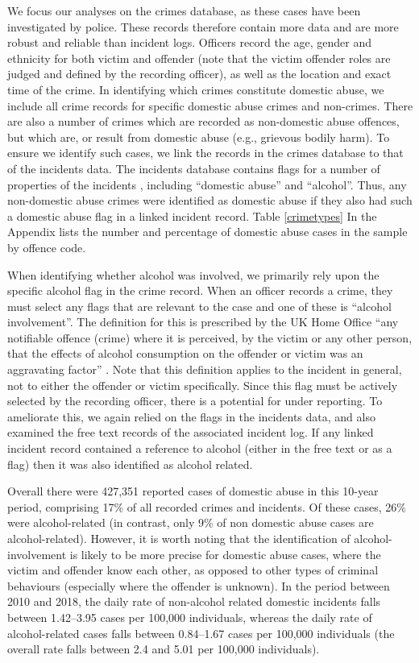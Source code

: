 \documentclass[12pt, a4paper]{article}
\begin{document}
We focus our analyses on the crimes database, as these cases have been investigated by police. These records therefore contain more data and are more robust and reliable than incident logs. Officers record the age, gender and ethnicity for both victim and offender (note that the victim offender roles are judged and defined by the recording officer), as well as the location and exact time of the crime. 
In identifying which crimes constitute domestic abuse, we include all crime records for specific domestic abuse crimes and non-crimes. There are also a number of crimes which are recorded as non-domestic abuse offences, but which are, or result from domestic abuse (e.g., grievous bodily harm). To ensure we identify such cases, we link the records in the crimes database to that of the incidents data. The incidents database contains flags for a number of properties of the incidents , including ``domestic abuse'' and ``alcohol''. Thus, any non-domestic abuse crimes were identified as domestic abuse if they also had such a domestic abuse flag in a linked incident record. Table \ref{crimetypes} In the Appendix lists the number and percentage of domestic abuse cases in the sample by offence code.

When identifying whether alcohol was involved, we primarily rely upon the specific alcohol flag in the crime record. When an officer records a crime, they must select any flags that are relevant to the case and one of these is ``alcohol involvement''. The definition for this is prescribed by the UK Home Office ``any notifiable offence (crime) where it is perceived, by the victim or any other person, that the effects of alcohol consumption on the offender or victim was an aggravating factor'' \cite{Office2019}. Note that this definition applies to the incident in general, not to either the offender or victim specifically. Since this flag must be actively selected by the recording officer, there is a potential for under reporting. To ameliorate this, we again relied on the flags in the incidents data, and also examined the free text records of the associated incident log. If any linked incident record contained a reference to alcohol (either in the free text or as a flag) then it was also identified as alcohol related.


 Overall there were 427,351 reported cases of domestic abuse in this 10-year period, comprising 17\% of all recorded crimes and incidents. Of these cases, 26\% were alcohol-related (in contrast, only 9\% of non domestic abuse cases are alcohol-related). However, it is worth noting that the identification of alcohol-involvement is likely to be more precise for domestic abuse cases, where the victim and offender know each other, as opposed to other types of criminal behaviours (especially where the offender is unknown). In the period between 2010 and 2018, the daily rate of non-alcohol related domestic incidents falls between 1.42--3.95 cases per 100,000 individuals, whereas the daily rate of alcohol-related cases falls between 0.84--1.67 cases per 100,000 individuals (the overall rate falls between 2.4 and 5.01 per 100,000 individuals). 
 
\end{document}
